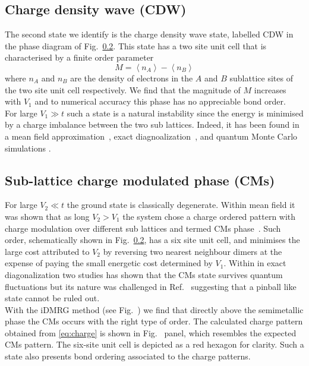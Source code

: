 \documentclass[aps,prx,10pt,twocolumn,floatfix,superscriptaddress,showpacs,numerical,footinbib]{revtex4-1}
\begin{document}
\subsection{Charge density wave (CDW)}
%
The second state we identify is the charge density wave state, labelled CDW in the phase diagram of Fig.~\ref{}.
%
This state has a two site unit cell that is characterised by a finite order parameter
%
\begin{equation}
\label{eq:CDW}
%
M=\left\langle n_{A} \right\rangle-\left\langle n_{B}\right\rangle
%
\end{equation}
%
where $n_{A}$ and $n_{B}$ are the density of electrons in the $A$ and $B$ sublattice sites of the two site unit cell respectively.
%
We find that the magnitude of $M$ increases with $V_{1}$ and to numerical accuracy this phase has no appreciable bond order.\\
%

For large $V_{1}\gg t$ such a state is a natural instability since the energy is minimised by a charge imbalance between the two sub lattices.
%
Indeed, it has been found in a mean field approximation~\cite{Raghu,Franz,us}, exact diagnoalization~\cite{us,daghofer,herbut}, and quantum Monte Carlo simulations
\cite{QMC}.
%


\subsection{Sub-lattice charge modulated phase (CMs)}
%
For large $V_{2}\ll t$ the ground state is classically degenerate. 
%
Within mean field it was shown that as long $V_{2}>V_{1}$
the system chose a charge ordered pattern with charge modulation over different sub lattices and termed CMs phase~\cite{CMs}.
%
Such order, schematically shown in Fig.~\ref{}, has a six site unit cell, and minimises the large cost
attributed to $V_{2}$ by reversing two nearest neighbour dimers at the expense of paying the small energetic cost
determined by $V_{1}$.
%
Within in exact diagonalization two studies has shown that the CMs state survives quantum fluctuations 
but its nature was challenged in Ref.~ suggesting that a pinball like state cannot be ruled out.\\

With the iDMRG method (see Fig.~\cite{s}) we find that directly above the semimetallic phase the CMs occurs with the right type of order.
%
The calculated charge pattern obtained from \eqref{eq:charge} is shown in Fig.~\cite{} panel, which resembles the expected
CMs pattern.
%
The six-site unit cell is depicted as a red hexagon for clarity. 
%
Such a state also presents bond ordering associated to the charge patterns.
\end{document}
